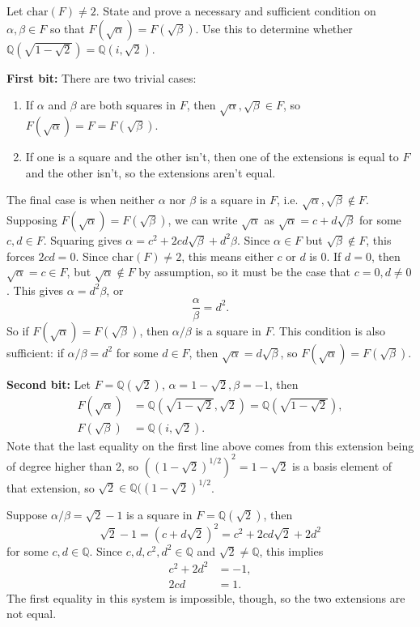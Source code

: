 \documentclass[10pt]{report}
\begin{document}
\pagebreak
\begin{exer}[14.7: 3]
	Let $\text{char}(F)\neq 2$. State and prove a necessary and sufficient condition on $\alpha,\beta\in F$ so that $F(\sqrt{\alpha} ) = F(\sqrt{\beta} )$. Use this to determine whether $\mathbb{Q}(\sqrt{1-\sqrt{2} } )=\mathbb{Q}(i,\sqrt{2} )$.
\end{exer}
\textbf{First bit:} There are two trivial cases:
\begin{enumerate}
	\item If $\alpha$ and $\beta$ are both squares in $F$, then $\sqrt{\alpha} ,\sqrt{\beta} \in F$, so $F(\sqrt{\alpha} )=F = F(\sqrt{\beta} )$.
	\item If one is a square and the other isn't, then one of the extensions is equal to $F$ and the other isn't, so the extensions aren't equal.
\end{enumerate}
The final case is when neither $\alpha$ nor $\beta$ is a square in $F$, i.e. $\sqrt{\alpha} ,\sqrt{\beta} \not\in F$. Supposing $F(\sqrt{\alpha} )=F(\sqrt{\beta} )$, we can write $\sqrt{\alpha} $ as $\sqrt{\alpha} =c + d \sqrt{\beta} $ for some $c,d \in F$. Squaring gives $\alpha=c^2+2cd\sqrt{\beta} +d^2\beta$. Since $\alpha \in F$ but $\sqrt{\beta} \not\in F$, this forces $2cd=0$. Since $\text{char}(F)\neq 2$, this means either $c$ or $d$ is 0. If $d=0$, then $\sqrt{\alpha} =c \in F$, but $\sqrt{\alpha} \not\in F$ by assumption, so it must be the case that $c=0, d\neq 0$. This gives $\alpha = d^2\beta$, or
\[
\frac{\alpha}{\beta} =d^2.
\] 
So if $F(\sqrt{\alpha})=F(\sqrt{\beta} )$, then $\alpha/\beta$ is a square in $F$. This condition is also sufficient: if $\alpha/\beta = d^2$ for some $d \in F$, then $\sqrt{\alpha} =d \sqrt{\beta} $, so $F(\sqrt{\alpha} )=F(\sqrt{\beta} )$.

\textbf{Second bit:} Let $F=\mathbb{Q}(\sqrt{2} )$, $\alpha=1-\sqrt{2} , \beta=-1$, then
\begin{align*}
	F(\sqrt{\alpha} )&=\mathbb{Q}(\sqrt{1-\sqrt{2} } ,\sqrt{2} )=\mathbb{Q}(\sqrt{1-\sqrt{2} } ), \\
	F(\sqrt{\beta} )&=\mathbb{Q}(i, \sqrt{2} ).
\end{align*}
Note that the last equality on the first line above comes from this extension being of degree higher than 2, so $((1-\sqrt{2} )^{1/2})^{2}= 1-\sqrt{2}$ is a basis element of that extension, so $\sqrt{2} \in \mathbb{Q}((1-\sqrt{2} )^{1/2}$.

Suppose $\alpha/\beta=\sqrt{2} -1$ is a square in $F=\mathbb{Q}(\sqrt{2} )$, then
\[
	\sqrt{2} -1=(c+d\sqrt{2} )^2=c^2+2cd\sqrt{2} +2d^2
\] for some $c,d \in \mathbb{Q}$. Since $c,d,c^2,d^2 \in \mathbb{Q}$ and $\sqrt{2} \neq \mathbb{Q}$, this implies
\begin{align*}
	c^2+2d^2&=-1,\\
	2cd&=1.
\end{align*}
The first equality in this system is impossible, though, so the two extensions are not equal.
\end{document}

